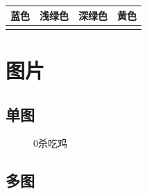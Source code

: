 \documentclass[12pt, a4paper, oneside]{ctexart}
\begin{document}
\begin{table}[htbp]
    \centering
    \begin{tabular}{cccc}
        \toprule
        \textbf{蓝色}                      & \textbf{浅绿色}                            & \textbf{深绿色}                           & \textbf{黄色}                        \\
        \midrule
        \cellcolor{blue}\footnotemark[1] & \cellcolor{light_green}\footnotemark[2] & \cellcolor{dark_green}\footnotemark[3] & \cellcolor{yellow}\footnotemark[4] \\
        \bottomrule
    \end{tabular}
\end{table}

\newpage

\section{图片}
\subsection{单图}
\begin{figure} [htbp!]

    \caption{0杀吃鸡}
    \label{fig1}
\end{figure}
\newpage
\subsection{多图}
\end{document}
